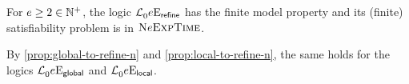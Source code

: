 \begin{proposition}
For $e \geq 2 \in \mathbb{N}^{+}$, the logic $\mathcal{L}^{{}}_{0}{e}\mathrm{E}_{\mathsf{refine}}$ has the
finite model property and its (finite) satisfiability problem is in
$\text{\normalfont{\scshape N}}e\text{\normalfont{\scshape ExpTime}}$.

By \cref{prop:global-to-refine-n} and \cref{prop:local-to-refine-n}, the same
holds for the logics $\mathcal{L}^{{}}_{0}{e}\mathrm{E}_{\mathsf{global}}$ and
$\mathcal{L}^{{}}_{0}{e}\mathrm{E}_{\mathsf{local}}$.
\end{proposition}
